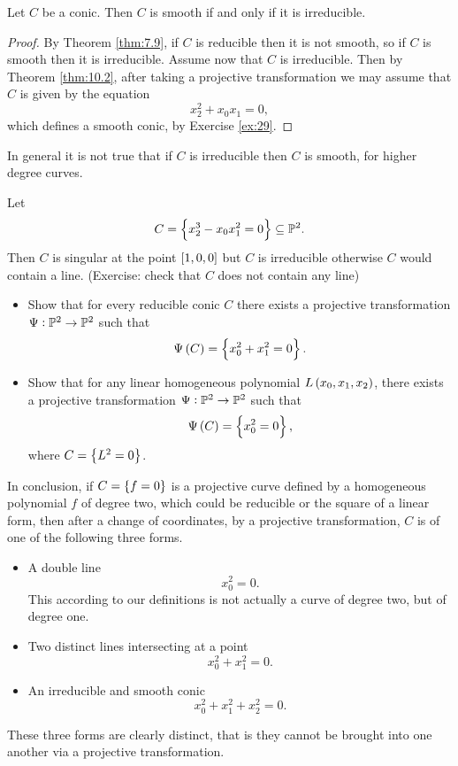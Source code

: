 \begin{corollary}
\label{cor:10.4}
Let $ C $ be a conic. Then $ C $ is smooth if and only if it is irreducible.
\end{corollary}

\begin{proof}
By Theorem \ref{thm:7.9}, if $ C $ is reducible then it is not smooth, so if $ C $ is smooth then it is irreducible. Assume now that $ C $ is irreducible. Then by Theorem \ref{thm:10.2}, after taking a projective transformation we may assume that $ C $ is given by the equation
$$ x_2^2 + x_0x_1 = 0, $$
which defines a smooth conic, by Exercise \ref{ex:29}.
\end{proof}

\begin{remark}
In general it is not true that if $ C $ is irreducible then $ C $ is smooth, for higher degree curves.
\end{remark}

\begin{example}
Let
$$ C = \cbr{x_2^3 - x_0x_1^2 = 0} \subseteq \P^2. $$
Then $ C $ is singular at the point $ \sbr{1, 0, 0} $ but $ C $ is irreducible otherwise $ C $ would contain a line. (Exercise: check that $ C $ does not contain any line)
\end{example}

\begin{exercise}
\label{ex:30}
\hfill
\begin{itemize}
\item Show that for every reducible conic $ C $ there exists a projective transformation $ \Psi : \P^2 \to \P^2 $ such that
$$ \Psi\br{C} = \cbr{x_0^2 + x_1^2 = 0}. $$
\item Show that for any linear homogeneous polynomial $ L\br{x_0, x_1, x_2} $, there exists a projective transformation $ \Psi : \P^2 \to \P^2 $ such that
$$ \Psi\br{C} = \cbr{x_0^2 = 0}, $$
where $ C = \cbr{L^2 = 0} $.
\end{itemize}
\end{exercise}

\pagebreak

In conclusion, if $ C = \cbr{f = 0} $ is a projective curve defined by a homogeneous polynomial $ f $ of degree two, which could be reducible or the square of a linear form, then after a change of coordinates, by a projective transformation, $ C $ is of one of the following three forms.
\begin{itemize}
\item A double line
$$ x_0^2 = 0. $$
This according to our definitions is not actually a curve of degree two, but of degree one.
\item Two distinct lines intersecting at a point
$$ x_0^2 + x_1^2 = 0. $$
\item An irreducible and smooth conic
$$ x_0^2 + x_1^2 + x_2^2 = 0. $$
\end{itemize}
These three forms are clearly distinct, that is they cannot be brought into one another via a projective transformation.

